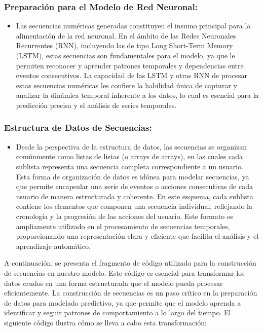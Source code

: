 \subsubsection{Preparación para el Modelo de Red Neuronal:}

\begin{itemize}
    \item Las secuencias numéricas generadas constituyen el insumo principal para la alimentación de la red neuronal. En el ámbito de las Redes Neuronales Recurrentes (RNN), incluyendo las de tipo Long Short-Term Memory (LSTM), estas secuencias son fundamentales para el modelo, ya que le permiten reconocer y aprender patrones temporales y dependencias entre eventos consecutivos. La capacidad de las LSTM y otras RNN de procesar estas secuencias numéricas les confiere la habilidad única de capturar y analizar la dinámica temporal inherente a los datos, lo cual es esencial para la predicción precisa y el análisis de series temporales.
\end{itemize}

\subsubsection{Estructura de Datos de Secuencias:}

\begin{itemize}
    \item Desde la perspectiva de la estructura de datos, las secuencias se organizan comúnmente como listas de listas (o arrays de arrays), en las cuales cada sublista representa una secuencia completa correspondiente a un usuario. Esta forma de organización de datos es idónea para modelar secuencias, ya que permite encapsular una serie de eventos o acciones consecutivas de cada usuario de manera estructurada y coherente. En este esquema, cada sublista contiene los elementos que componen una secuencia individual, reflejando la cronología y la progresión de las acciones del usuario. Este formato es ampliamente utilizado en el procesamiento de secuencias temporales, proporcionando una representación clara y eficiente que facilita el análisis y el aprendizaje automático.
\end{itemize}

A continuación, se presenta el fragmento de código utilizado para la construcción de secuencias en nuestro modelo. Este código es esencial para transformar los datos crudos en una forma estructurada que el modelo pueda procesar eficientemente. La construcción de secuencias es un paso crítico en la preparación de datos para modelado predictivo, ya que permite que el modelo aprenda a identificar y seguir patrones de comportamiento a lo largo del tiempo. El siguiente código ilustra cómo se lleva a cabo esta transformación:

